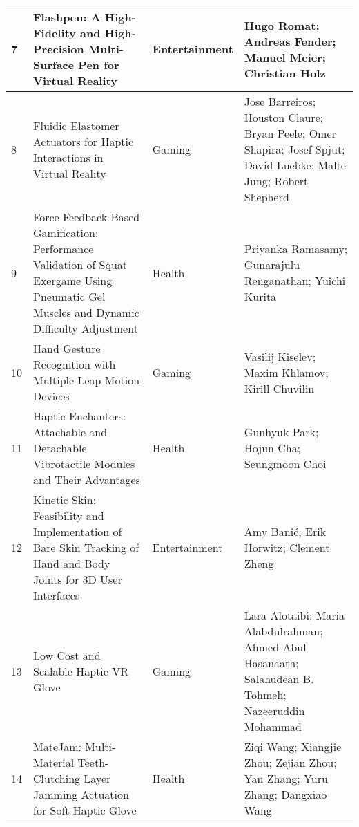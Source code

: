 \begin{landscape}
\begin{table}[]
{\begin{tabular}{|l|l|l|l|}
				7                                & Flashpen: A High-Fidelity and High-Precision Multi-Surface Pen for Virtual Reality                                                        & Entertainment                            & Hugo Romat; Andreas Fender; Manuel Meier; Christian Holz                          \\ \hline
				8                                & Fluidic Elastomer Actuators for Haptic Interactions in Virtual Reality                                                                    & Gaming                                   & Jose Barreiros; Houston Claure; Bryan Peele; Omer Shapira; Josef Spjut; David Luebke; Malte Jung; Robert Shepherd                                \\ \hline
				9                                & Force Feedback-Based Gamification: Performance Validation of Squat Exergame Using Pneumatic Gel Muscles and Dynamic Difficulty Adjustment & Health                                   & Priyanka Ramasamy; Gunarajulu Renganathan; Yuichi Kurita                   \\ \hline
				10                               & Hand Gesture Recognition with Multiple Leap Motion Devices                                                                                & Gaming                                   & Vasilij Kiselev; Maxim Khlamov; Kirill Chuvilin                                         \\ \hline
				11                               & Haptic Enchanters: Attachable and Detachable Vibrotactile Modules and Their Advantages                                                    & Health                                   & Gunhyuk Park; Hojun Cha; Seungmoon Choi                   \\ \hline
				12                               & Kinetic Skin: Feasibility and Implementation of Bare Skin Tracking of Hand and Body Joints for 3D User Interfaces                         & Entertainment                            & Amy Banić; Erik Horwitz; Clement Zheng                            \\ \hline
				13                               & Low Cost and Scalable Haptic VR Glove                                                                                                     & Gaming                                   & Lara Alotaibi; Maria Alabdulrahman; Ahmed Abul Hasanaath; Salahudean B. Tohmeh; Nazeeruddin Mohammad                 \\ \hline
				14                               & MateJam: Multi-Material Teeth-Clutching Layer Jamming Actuation for Soft Haptic Glove                                                     & Health                                   & Ziqi Wang; Xiangjie Zhou; Zejian Zhou; Yan Zhang; Yuru Zhang; Dangxiao Wang      \\ \hline

\end{tabular}}
\end{table}
\end{landscape}
